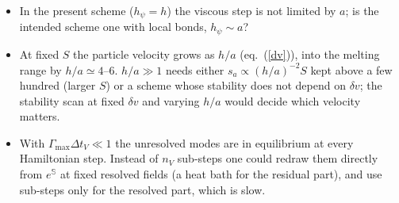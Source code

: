 \documentclass[11pt,aps,preprint,nofootinbib,superscriptaddress,tightenlines]{revtex4-2}
\def\Eq#1{eq.~(\ref{#1})}
\begin{document}
\begin{itemize}
\item In the present scheme ($h_\psi=h$) the viscous step is not limited by $a$; is the
  intended scheme one with local bonds, $h_\psi\sim a$?
\item At fixed $S$ the particle velocity grows as $h/a$ (\Eq{dv}), into the melting range
  by $h/a\simeq4$--$6$.  $h/a\gg1$ needs either $s_a\propto(h/a)^{-2}S$ kept above a
  few hundred (larger $S$) or a scheme whose stability does not depend on $\delta v$; the
  stability scan at fixed $\delta v$ and varying $h/a$ would decide which velocity matters.
\item With $\Gamma_{\max}\Delta t_V\ll1$ the unresolved modes are in equilibrium at every
  Hamiltonian step.  Instead of $n_V$ sub-steps one could redraw them directly from
  $e^{\mathbb S}$ at fixed resolved fields (a heat bath for the residual part), and use
  sub-steps only for the resolved part, which is slow.
\end{itemize}
\end{document}
